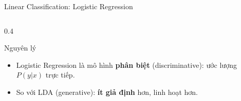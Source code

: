 \begin{frame}[shrink=40]{Linear Classification: Logistic Regression}
\begin{columns}[T]
\begin{column}{0.4\textwidth}
            \begin{alertblock}{Nguyên lý}
                \begin{itemize}
                    \item Logistic Regression là mô hình \textbf{phân biệt} (discriminative): ước lượng $P(y|x)$ trực tiếp.
                    \item So với LDA (generative): \textbf{ít giả định} hơn, linh hoạt hơn.
                \end{itemize}
            \end{alertblock}
        \end{column}
    \end{columns}
\end{frame}


